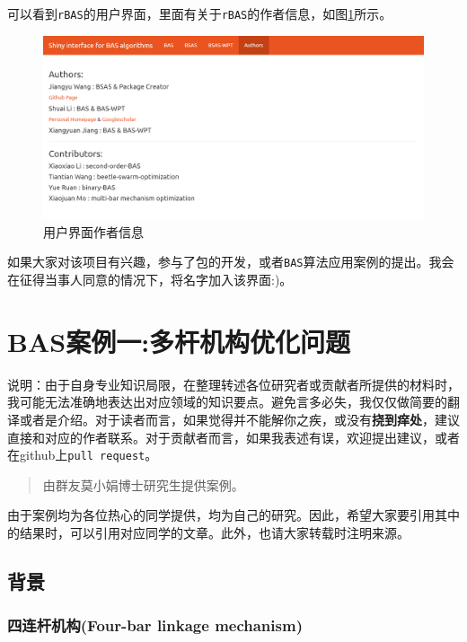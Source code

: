 \documentclass[]{ctexbook}
\begin{document}
可以看到\texttt{rBAS}的用户界面，里面有关于\texttt{rBAS}的作者信息，如图\ref{fig:author}所示。

\begin{figure}

{\centering \includegraphics[width=1\linewidth]{img/author} 

}

\caption{用户界面作者信息}\label{fig:author}
\end{figure}

如果大家对该项目有兴趣，参与了包的开发，或者\texttt{BAS}算法应用案例的提出。我会在征得当事人同意的情况下，将名字加入该界面:)。

\chapter{BAS案例一:多杆机构优化问题}\label{examples}

说明：由于自身专业知识局限，在整理转述各位研究者或贡献者所提供的材料时，我可能无法准确地表达出对应领域的知识要点。避免言多必失，我仅仅做简要的翻译或者是介绍。对于读者而言，如果觉得并不能解你之疾，或没有\textbf{挠到痒处}，建议直接和对应的作者联系。对于贡献者而言，如果我表述有误，欢迎提出建议，或者在github上\texttt{pull\ request}。

\begin{quote}
由群友莫小娟博士研究生提供案例。
\end{quote}

由于案例均为各位热心的同学提供，均为自己的研究。因此，希望大家要引用其中的结果时，可以引用对应同学的文章。此外，也请大家转载时注明来源。

\section{背景}

\subsection{四连杆机构(Four-bar linkage mechanism)}\label{bars4}
\end{document}

